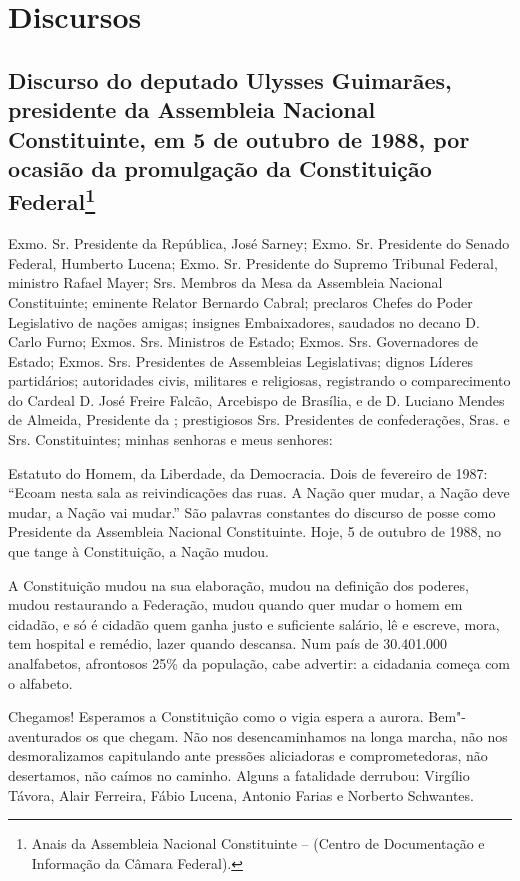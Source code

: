 \part{Discursos}

\chapter*{Discurso do deputado Ulysses Guimarães, presidente da Assembleia
Nacional Constituinte, em 5 de outubro de 1988, por ocasião da
promulgação da Constituição Federal\footnote{Anais da Assembleia Nacional Constituinte –  (Centro de Documentação e Informação da Câmara Federal).}}


Exmo. Sr. Presidente da República, José Sarney; Exmo. Sr. Presidente
do Senado Federal, Humberto Lucena; Exmo. Sr. Presidente do Supremo
Tribunal Federal, ministro Rafael Mayer; Srs. Membros da Mesa da
Assembleia Nacional Constituinte; eminente Relator Bernardo Cabral;
preclaros Chefes do Poder Legislativo de nações amigas; insignes
Embaixadores, saudados no decano D. Carlo Furno; Exmos. Srs. Ministros
de Estado; Exmos. Srs. Governadores de Estado; Exmos. Srs. Presidentes
de Assembleias Legislativas; dignos Líderes partidários; autoridades
civis, militares e religiosas, registrando o comparecimento do Cardeal
D. José Freire Falcão, Arcebispo de Brasília, e de D. Luciano Mendes de
Almeida, Presidente da ; prestigiosos Srs. Presidentes de
confederações, Sras. e Srs. Constituintes; minhas senhoras e meus
senhores:

Estatuto do Homem, da Liberdade, da Democracia. Dois de fevereiro de
1987: ``Ecoam nesta sala as reivindicações das ruas. A Nação quer mudar,
a Nação deve mudar, a Nação vai mudar.'' São palavras constantes do
discurso de posse como Presidente da Assembleia Nacional Constituinte.
Hoje, 5 de outubro de 1988, no que tange à Constituição, a Nação mudou.

A Constituição mudou na sua elaboração, mudou na definição dos poderes,
mudou restaurando a Federação, mudou quando quer mudar o homem em
cidadão, e só é cidadão quem ganha justo e suficiente salário, lê e
escreve, mora, tem hospital e remédio, lazer quando descansa. Num país
de 30.401.000 analfabetos, afrontosos 25\% da população, cabe advertir:
a cidadania começa com o alfabeto.

Chegamos! Esperamos a Constituição como o vigia espera a aurora.
Bem"-aventurados os que chegam. Não nos desencaminhamos na longa marcha,
não nos desmoralizamos capitulando ante pressões aliciadoras e
comprometedoras, não desertamos, não caímos no caminho. Alguns a
fatalidade derrubou: Virgílio Távora, Alair Ferreira, Fábio
Lucena, Antonio Farias e Norberto Schwantes.

